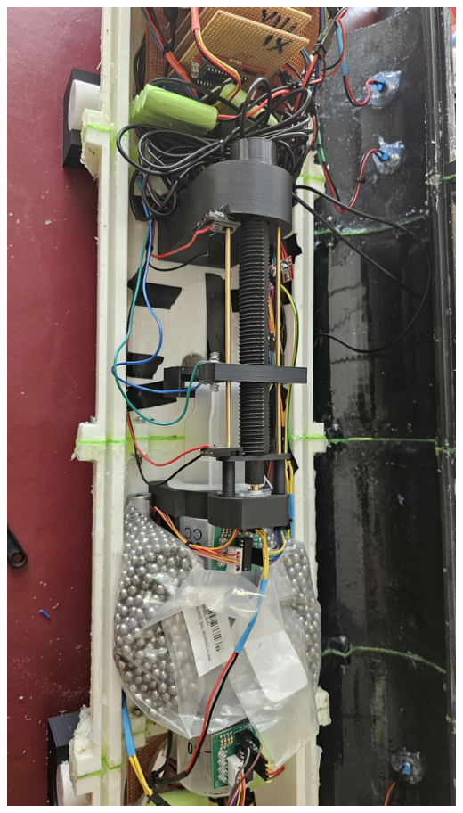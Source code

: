 \documentclass[11pt,a4paper,titlepage]{report}
\begin{document}
	\begin{center}
		\label{picture:images_build_7}
		\includegraphics[width=\linewidth]{assets/AUV_Build7.jpg}
	\end{center}
\end{document}
